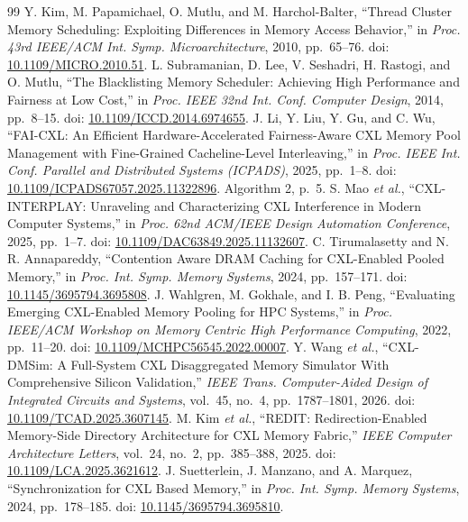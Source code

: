 \documentclass[10pt,letterpaper,twocolumn]{article}
\begin{document}
\begin{thebibliography}{99}
 Y. Kim, M. Papamichael, O. Mutlu, and M. Harchol-Balter, ``Thread Cluster Memory Scheduling: Exploiting Differences in Memory Access Behavior,'' in \emph{Proc. 43rd IEEE/ACM Int. Symp. Microarchitecture}, 2010, pp.~65--76. doi: \href{https://doi.org/10.1109/MICRO.2010.51}{10.1109/MICRO.2010.51}.
 L. Subramanian, D. Lee, V. Seshadri, H. Rastogi, and O. Mutlu, ``The Blacklisting Memory Scheduler: Achieving High Performance and Fairness at Low Cost,'' in \emph{Proc. IEEE 32nd Int. Conf. Computer Design}, 2014, pp.~8--15. doi: \href{https://doi.org/10.1109/ICCD.2014.6974655}{10.1109/ICCD.2014.6974655}.
 J. Li, Y. Liu, Y. Gu, and C. Wu, ``FAI-CXL: An Efficient Hardware-Accelerated Fairness-Aware CXL Memory Pool Management with Fine-Grained Cacheline-Level Interleaving,'' in \emph{Proc. IEEE Int. Conf. Parallel and Distributed Systems (ICPADS)}, 2025, pp.~1--8. doi: \href{https://doi.org/10.1109/ICPADS67057.2025.11322896}{10.1109/ICPADS67057.2025.11322896}. Algorithm 2, p.~5.
 S. Mao \emph{et al.}, ``CXL-INTERPLAY: Unraveling and Characterizing CXL Interference in Modern Computer Systems,'' in \emph{Proc. 62nd ACM/IEEE Design Automation Conference}, 2025, pp.~1--7. doi: \href{https://doi.org/10.1109/DAC63849.2025.11132607}{10.1109/DAC63849.2025.11132607}.
 C. Tirumalasetty and N. R. Annapareddy, ``Contention Aware DRAM Caching for CXL-Enabled Pooled Memory,'' in \emph{Proc. Int. Symp. Memory Systems}, 2024, pp.~157--171. doi: \href{https://doi.org/10.1145/3695794.3695808}{10.1145/3695794.3695808}.
 J. Wahlgren, M. Gokhale, and I. B. Peng, ``Evaluating Emerging CXL-Enabled Memory Pooling for HPC Systems,'' in \emph{Proc. IEEE/ACM Workshop on Memory Centric High Performance Computing}, 2022, pp.~11--20. doi: \href{https://doi.org/10.1109/MCHPC56545.2022.00007}{10.1109/MCHPC56545.2022.00007}.
 Y. Wang \emph{et al.}, ``CXL-DMSim: A Full-System CXL Disaggregated Memory Simulator With Comprehensive Silicon Validation,'' \emph{IEEE Trans. Computer-Aided Design of Integrated Circuits and Systems}, vol.~45, no.~4, pp.~1787--1801, 2026. doi: \href{https://doi.org/10.1109/TCAD.2025.3607145}{10.1109/TCAD.2025.3607145}.
 M. Kim \emph{et al.}, ``REDIT: Redirection-Enabled Memory-Side Directory Architecture for CXL Memory Fabric,'' \emph{IEEE Computer Architecture Letters}, vol.~24, no.~2, pp.~385--388, 2025. doi: \href{https://doi.org/10.1109/LCA.2025.3621612}{10.1109/LCA.2025.3621612}.
 J. Suetterlein, J. Manzano, and A. Marquez, ``Synchronization for CXL Based Memory,'' in \emph{Proc. Int. Symp. Memory Systems}, 2024, pp.~178--185. doi: \href{https://doi.org/10.1145/3695794.3695810}{10.1145/3695794.3695810}.

\end{thebibliography}
\end{document}
